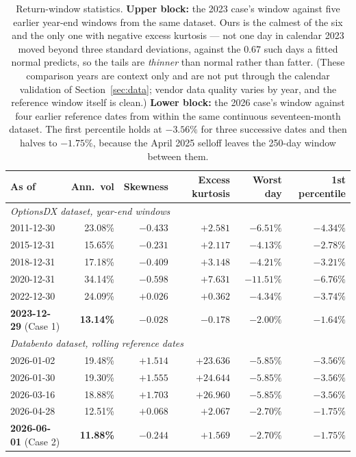 \documentclass[11pt]{article}
\begin{document}
\begin{table}[t]
\centering
\small
\caption{Return-window statistics. \textbf{Upper block:} the 2023 case's window against
five earlier year-end windows from the same dataset. Ours is the calmest of the six and
the only one with negative excess kurtosis --- not one day in calendar 2023 moved beyond
three standard deviations, against the $0.67$ such days a fitted normal predicts, so the
tails are \emph{thinner} than normal rather than fatter. (These comparison years are
context only and are not put through the calendar validation of Section~\ref{sec:data};
vendor data quality varies by year, and the reference window itself is clean.)
\textbf{Lower block:} the 2026 case's window against four earlier reference dates from
within the same continuous seventeen-month dataset. The first percentile holds at
$-3.56\%$ for three successive dates and then halves to $-1.75\%$, because the April 2025
selloff leaves the 250-day window between them.}
\label{tab:windows}
\begin{tabular}{lrrrrr}
\toprule
As of & Ann.\ vol & Skewness & Excess kurtosis & Worst day & 1st percentile \\
\midrule
\multicolumn{6}{l}{\emph{OptionsDX dataset, year-end windows}}\\
2011-12-30 & 23.08\% & $-0.433$ & $+2.581$ & $-6.51\%$ & $-4.34\%$ \\
2015-12-31 & 15.65\% & $-0.231$ & $+2.117$ & $-4.13\%$ & $-2.78\%$ \\
2018-12-31 & 17.18\% & $-0.409$ & $+3.148$ & $-4.21\%$ & $-3.21\%$ \\
2020-12-31 & 34.14\% & $-0.598$ & $+7.631$ & $-11.51\%$ & $-6.76\%$ \\
2022-12-30 & 24.09\% & $+0.026$ & $+0.362$ & $-4.34\%$ & $-3.74\%$ \\
\textbf{2023-12-29} (Case 1) & \textbf{13.14\%} & $\mathbf{-0.028}$ & $\mathbf{-0.178}$ & $\mathbf{-2.00\%}$ & $\mathbf{-1.64\%}$ \\
\midrule
\multicolumn{6}{l}{\emph{Databento dataset, rolling reference dates}}\\
2026-01-02 & 19.48\% & $+1.514$ & $+23.636$ & $-5.85\%$ & $-3.56\%$ \\
2026-01-30 & 19.30\% & $+1.555$ & $+24.644$ & $-5.85\%$ & $-3.56\%$ \\
2026-03-16 & 18.88\% & $+1.703$ & $+26.960$ & $-5.85\%$ & $-3.56\%$ \\
2026-04-28 & 12.51\% & $+0.068$ & $+2.067$  & $-2.70\%$ & $-1.75\%$ \\
\textbf{2026-06-01} (Case 2) & \textbf{11.88\%} & $\mathbf{-0.244}$ & $\mathbf{+1.569}$ & $\mathbf{-2.70\%}$ & $\mathbf{-1.75\%}$ \\
\bottomrule
\end{tabular}
\end{table}
\end{document}

